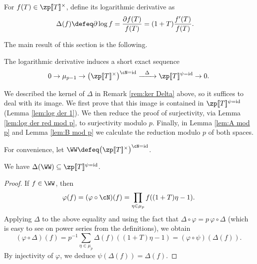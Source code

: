 \documentclass[a4paper,10pt, english, reqno]{smfart}
\newcommand{\lsem}{[\! [}
\newcommand{\rsem}{]\! ]}
\numberwithin{equation}{section}
\begin{document}
\begin{definition}
	For $f(T) \in \zp\lsem T\rsem ^\times$, define its logarithmic derivative as
	\begin{align*} 
		\Delta(f) &\defeq \partial\log f
		=\frac{\partial f(T)}{f(T)} = (1 + T) \frac{f'(T)}{f(T)}. 
	\end{align*}
\end{definition}

The main result of this section is the following.

\begin{theorem} \label{thm:log der}
The logarithmic derivative   induces a short exact sequence
\[ 0 \to \mu_{p-1} \to \big( \zp\lsem T\rsem ^\times \big)^{\cN=\mathrm{id}} \xrightarrow{\ \ \Delta\ \ } \zp\lsem T\rsem ^{\psi=\mathrm{id}} \to 0. \]
\end{theorem}

 We described the kernel of $\Delta$ in Remark \ref{rem:ker Delta} above, so it suffices to deal with its image. We first prove that this image is contained in $\zp\lsem T\rsem ^{\psi=\mathrm{id}}$  (Lemma \ref{lem:log der 1}). We then reduce the proof of surjectivity, via Lemma \ref{lem:log der red mod p}, to surjectivity modulo $p$. Finally, in Lemma \ref{lem:A mod p} and Lemma \ref{lem:B mod p} we calculate the reduction modulo $p$ of both spaces. 

For convenience, let $\WW \defeq \big( \zp\lsem T\rsem ^\times \big)^{\cN=\mathrm{id}}$.

\begin{lemma} \label{lem:log der 1}
	We have $\Delta(\WW) \subseteq \zp\lsem T\rsem ^{\psi=\mathrm{id}}$.%
\end{lemma}

\begin{proof}
	If $f \in \WW$, then
	\[ 
	\varphi(f) = (\varphi \circ \cN)(f) = \prod_{\eta \in \mu_p} f((1 + T)\eta - 1). 
	\]
	Applying $\Delta$ to the above equality and using the fact  that $\Delta \circ \varphi = p \, \varphi \circ \Delta$ (which is easy to see on power series from the definitions), we obtain
	\[ 
 (\varphi \circ \Delta)(f) = p^{-1} \sum_{\eta \in \mu_p} \Delta(f)((1 + T)\eta - 1) = (\varphi \circ \psi)(\Delta(f)).
 \] 
 By injectivity of $\varphi$, we deduce $\psi(\Delta(f)) = \Delta(f)$.
\end{proof}
\end{document}
